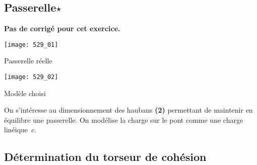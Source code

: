 \normaltrue
\correctionfalse


\subsection*{Passerelle$\star$ \label{C2:10:Coh:529}}
\setcounter{question}{0}

\ifcorrection
\else
\textbf{Pas de corrigé pour cet exercice.}
\fi



\begin{marginfigure}
\texttt{[image: 529\_01]}

\caption{Passerelle réelle}
\end{marginfigure}

\begin{marginfigure}
\texttt{[image: 529\_02]}

\caption{Modèle choisi}
\end{marginfigure}

On s'intéresse au dimensionnement des haubans \textbf{(2)} permettant de maintenir en équilibre une passerelle.
On modélise la charge sur le pont comme une charge linéique~$c$.

\subsection*{Détermination du torseur de cohésion}
\ifprof
\begin{corrige}~\\
\end{corrige}
\else
\fi

\ifprof
\begin{corrige}~\\
\end{corrige}
\else
\fi

\ifprof
\begin{corrige}~\\
\end{corrige}
\else
\fi

\ifprof
\begin{corrige}~\\
\end{corrige}
\else
\fi


